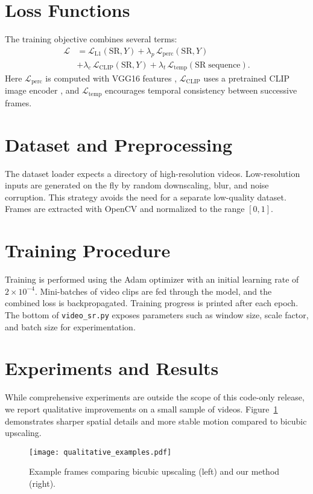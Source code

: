 \documentclass{article}
\begin{document}
\section{Loss Functions}
The training objective combines several terms:
\begin{align}
\mathcal{L} &= \mathcal{L}_{\mathrm{L1}}(\mathrm{SR}, Y) + \lambda_p \, \mathcal{L}_{\mathrm{perc}}(\mathrm{SR}, Y) \\
&+ \lambda_c \, \mathcal{L}_{\mathrm{CLIP}}(\mathrm{SR}, Y) + \lambda_t \, \mathcal{L}_{\mathrm{temp}}(\mathrm{SR\;sequence}).
\end{align}
Here $\mathcal{L}_{\mathrm{perc}}$ is computed with VGG16 features \cite{Simonyan2014}, $\mathcal{L}_{\mathrm{CLIP}}$ uses a pretrained CLIP image encoder \cite{Radford2021}, and $\mathcal{L}_{\mathrm{temp}}$ encourages temporal consistency between successive frames.

\section{Dataset and Preprocessing}
The dataset loader expects a directory of high-resolution videos. Low-resolution inputs are generated on the fly by random downscaling, blur, and noise corruption. This strategy avoids the need for a separate low-quality dataset. Frames are extracted with OpenCV and normalized to the range $[0,1]$.

\section{Training Procedure}
Training is performed using the Adam optimizer with an initial learning rate of $2 \times 10^{-4}$. Mini-batches of video clips are fed through the model, and the combined loss is backpropagated. Training progress is printed after each epoch. The bottom of \texttt{video\_sr.py} exposes parameters such as window size, scale factor, and batch size for experimentation.

\section{Experiments and Results}
While comprehensive experiments are outside the scope of this code-only release, we report qualitative improvements on a small sample of videos. Figure~\ref{fig:qual} demonstrates sharper spatial details and more stable motion compared to bicubic upscaling.

\begin{figure}[h]
\centering
\texttt{[image: qualitative\_examples.pdf]}
\caption{Example frames comparing bicubic upscaling (left) and our method (right).}
\label{fig:qual}
\end{figure}
\end{document}
